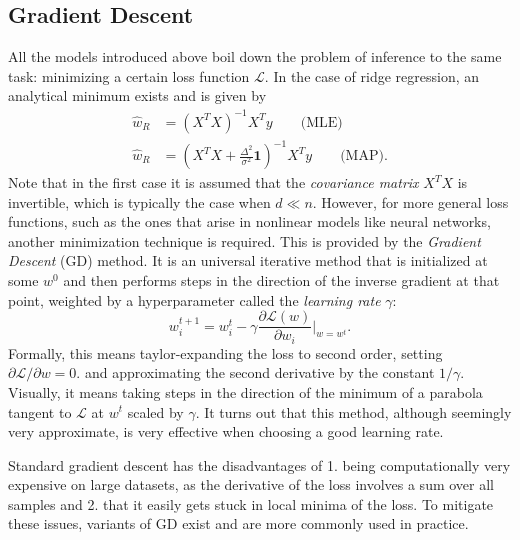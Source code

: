 \documentclass{article}
\begin{document}
\subsection{Gradient Descent}
All the models introduced above boil down the problem of inference to the same task: minimizing a certain loss function $\mathcal{L}$. In the case of ridge regression, an analytical minimum exists and is given by
\begin{align}
    \hat{w}_{R} &=(X^TX)^{-1}X^Ty \quad\quad\text{(MLE)} \\
    \hat{w}_{R} &=(X^TX + \frac{\Delta^2}{\sigma^2}\mathbf{1})^{-1}X^Ty \quad\quad\text{(MAP)}.
\end{align}
Note that in the first case it is assumed that the \emph{covariance matrix} $X^TX$ is invertible, which is typically the case when $d\ll n$.
However, for more general loss functions, such as the ones that arise in nonlinear models like neural networks, another minimization technique is required. This is provided by the \emph{Gradient Descent} (GD) method. It is an universal iterative method that is initialized at some $w^0$ and then performs steps in the direction of the inverse gradient at that point, weighted by a hyperparameter called the \emph{learning rate} $\gamma$:
\begin{equation}
    w_i^{t+1} = w_i^{t} - \gamma\frac{\partial\mathcal{L}(w)}{\partial w_i}\bigg |_{w=w^t}.
\end{equation}
Formally, this means taylor-expanding the loss to second order, setting $\partial\mathcal{L}/\partial w = 0$. and approximating the second derivative by the constant $1/\gamma$. Visually, it means taking steps in the direction of the minimum of a parabola tangent to $\mathcal{L}$ at $w^t$ scaled by $\gamma$. It turns out that this method, although seemingly very approximate, is very effective when choosing a good learning rate.

Standard gradient descent has the disadvantages of 1. being computationally very expensive on large datasets, as the derivative of the loss involves a sum over all samples and 2. that it easily gets stuck in local minima of the loss. To mitigate these issues, variants of GD exist and are more commonly used in practice.
\end{document}
